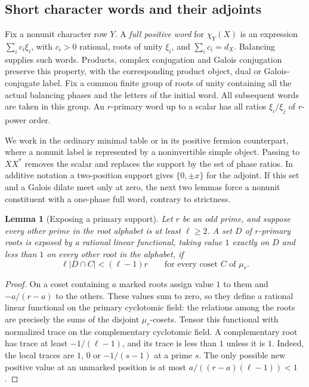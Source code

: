 \documentclass[11pt,a4paper]{article}
\numberwithin{equation}{section}
\newtheorem{lemma}[theorem]{Lemma}
\begin{document}
\subsection{Short character words and their adjoints}
\label{supp:section}

Fix a nonunit character row $Y$. A \emph{full positive word} for
$\chi_Y(X)$ is an expression $\sum_i c_i\xi_i$, with $c_i>0$
rational, roots of unity $\xi_i$, and $\sum_i c_i=d_X$.
Balancing supplies such words. Products, complex conjugation and
Galois conjugation preserve this property, with the corresponding
product object, dual or Galois-conjugate label. Fix a common finite group of roots of unity containing all the actual
balancing phases and the letters of the initial word. All subsequent
words are taken in this group.
An $r$-primary word up to a scalar has all ratios $\xi_i/\xi_j$
of $r$-power order.

We work in the ordinary minimal table or in its positive fermion
counterpart, where a nonunit label is represented by a noninvertible
simple object. Passing to $XX^*$ removes the scalar and replaces the
support by the set of phase ratios. In additive notation a two-position
support gives $\{0,\pm x\}$ for the adjoint. If this set and a Galois
dilate meet only at zero, the next two lemmas force a nonunit
constituent with a one-phase full word, contrary to strictness.

\begin{lemma}[Exposing a primary support]\label{supp:exposure}
Let $r$ be an odd prime, and suppose every other prime in the root alphabet
is at least $\ell\ge2$. A set $D$ of $r$-primary roots is exposed
by a rational linear functional, taking value $1$ exactly on $D$
and less than $1$ on every other root in the alphabet, if
\[
             \ell|D\cap C|<(\ell-1)r
       \qquad\text{for every coset $C$ of $\mu_r$}.
\]
\end{lemma}
\begin{proof}
On a coset containing $a$ marked roots assign value $1$ to them
and $-a/(r-a)$ to the others. These values sum to zero, so they
define a rational linear functional on the primary cyclotomic
field: the relations among the roots are precisely the sums
of the disjoint $\mu_r$-cosets. Tensor this functional with
normalized trace on the complementary cyclotomic field. A
complementary root has trace at least $-1/(\ell-1)$, and its
trace is less than $1$ unless it is $1$. Indeed, the local
traces are $1$, $0$ or $-1/(s-1)$ at a prime $s$.
The only possible new positive value at an unmarked position
is at most $a/((r-a)(\ell-1))<1$.
\end{proof}
\end{document}
